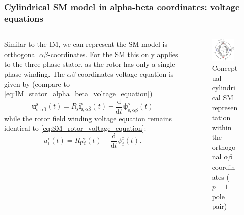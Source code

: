\begin{frame}
	\frametitle{Cylindrical SM model in alpha-beta coordinates: voltage equations}
    \begin{columns}
		\begin{column}{0.55\textwidth}
	       Similar to the IM, we can represent the SM model is orthogonal $\alpha\beta$-coordinates. For the SM this only applies to the three-phase stator, as the rotor has only a single phase winding. The $\alpha\beta$-coordinates voltage equation is given by (compare to \eqref{eq:IM_stator_alpha_beta_voltage_equation})
		   \begin{equation}
			\bm{u}^\mathrm{s}_\mathrm{s,\alpha\beta}(t) = R_\mathrm{s} \bm{i}^\mathrm{s}_\mathrm{s,\alpha\beta}(t)+ \frac{\mathrm{d}}{\mathrm{d}t}\bm{\psi}^\mathrm{s}_\mathrm{s,\alpha\beta}(t)
		   \end{equation}
		   while the rotor field winding voltage equation remains identical to \eqref{eq:SM_rotor_voltage_equation}:
		   $$
			u^\mathrm{r}_\mathrm{f}(t) = R_\mathrm{f}i^\mathrm{r}_\mathrm{f}(t)+\frac{\mathrm{d}}{\mathrm{d}t}\psi^\mathrm{r}_\mathrm{f}(t).
			$$
        \end{column}
        \begin{column}{0.45\textwidth}
            \begin{figure}
                \centering
                \includegraphics[width=0.85\textwidth]{fig/lec07/SM_cylindrical_rotor_alpha_beta.pdf}
                \caption{Conceptual cylindrical SM representation within the orthogonal $\alpha\beta$ coordinates ($p=1$ pole pair)}
                \label{fig:SM_alpha_beta}
            \end{figure}
        \end{column}
    \end{columns}
\end{frame}

